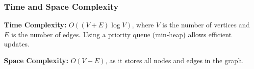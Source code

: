 \subsubsection{Time and Space Complexity}
\textbf{Time Complexity:} \( O((V + E) \log V) \), where \( V \) is the number of vertices and \( E \) is the number of edges. Using a priority queue (min-heap) allows efficient updates.

\textbf{Space Complexity:} \( O(V + E) \), as it stores all nodes and edges in the graph.
